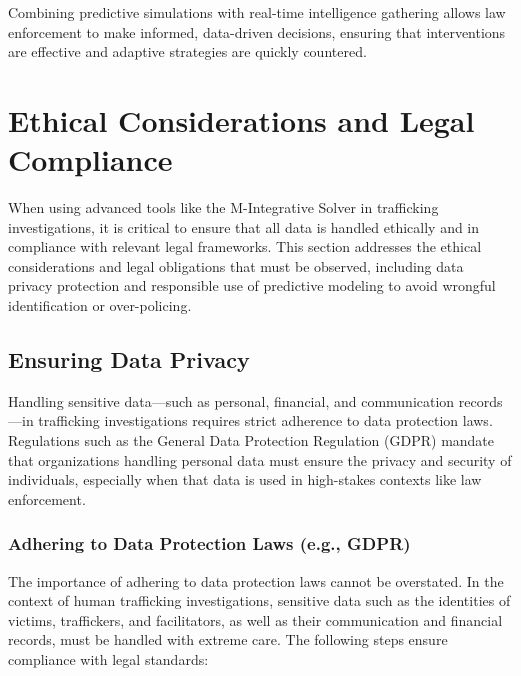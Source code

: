 \documentclass[%
 preprint, linenumbers,
 amsmath,amssymb,
 aps, physrev,
]{revtex4-2}
\begin{document}
Combining predictive simulations with real-time intelligence gathering allows law enforcement to make informed, data-driven decisions, ensuring that interventions are effective and adaptive strategies are quickly countered.

\section{Ethical Considerations and Legal Compliance}

When using advanced tools like the M-Integrative Solver in trafficking investigations, it is critical to ensure that all data is handled ethically and in compliance with relevant legal frameworks. This section addresses the ethical considerations and legal obligations that must be observed, including data privacy protection and responsible use of predictive modeling to avoid wrongful identification or over-policing.

\subsection{Ensuring Data Privacy}

Handling sensitive data—such as personal, financial, and communication records—in trafficking investigations requires strict adherence to data protection laws. Regulations such as the General Data Protection Regulation (GDPR) mandate that organizations handling personal data must ensure the privacy and security of individuals, especially when that data is used in high-stakes contexts like law enforcement.

\subsubsection{Adhering to Data Protection Laws (e.g., GDPR)}

The importance of adhering to data protection laws cannot be overstated. In the context of human trafficking investigations, sensitive data such as the identities of victims, traffickers, and facilitators, as well as their communication and financial records, must be handled with extreme care. The following steps ensure compliance with legal standards:
\end{document}
